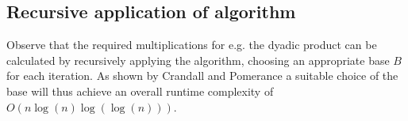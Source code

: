 \subsection{Recursive application of algorithm}

Observe that the required multiplications for e.g. the dyadic product can be
calculated by recursively applying the algorithm, choosing an appropriate base
$B$ for each iteration. As shown by Crandall and Pomerance a suitable choice of
the base will thus achieve an overall runtime complexity of $O(n \log(n)
\log(\log(n)))$. \autocite{crandallPrimeNumbersComputational2005}
